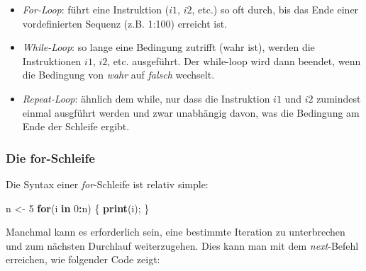 \documentclass[]{article}
\newenvironment{Shaded}{\begin{snugshade}}{\end{snugshade}}
\newcommand{\KeywordTok}[1]{\textcolor[rgb]{0.13,0.29,0.53}{\textbf{#1}}}
\newcommand{\DecValTok}[1]{\textcolor[rgb]{0.00,0.00,0.81}{#1}}
\newcommand{\StringTok}[1]{\textcolor[rgb]{0.31,0.60,0.02}{#1}}
\newcommand{\ControlFlowTok}[1]{\textcolor[rgb]{0.13,0.29,0.53}{\textbf{#1}}}
\newcommand{\OperatorTok}[1]{\textcolor[rgb]{0.81,0.36,0.00}{\textbf{#1}}}
\newcommand{\NormalTok}[1]{#1}
\providecommand{\tightlist}{%
  \setlength{\itemsep}{0pt}\setlength{\parskip}{0pt}}
\begin{document}
\begin{itemize}
\tightlist
\item
  \emph{For-Loop}: führt eine Instruktion (\(i1\), \(i2\), etc.) so oft
  durch, bis das Ende einer vordefinierten Sequenz (z.B. 1:100) erreicht
  ist.
\item
  \emph{While-Loop}: so lange eine Bedingung zutrifft (wahr ist), werden
  die Instruktionen \(i1\), \(i2\), etc. ausgeführt. Der while-loop wird
  dann beendet, wenn die Bedingung von \emph{wahr} auf \emph{falsch}
  wechselt.
\item
  \emph{Repeat-Loop}: ähnlich dem while, nur dass die Instruktion \(i1\)
  und \(i2\) zumindest einmal ausgführt werden und zwar unabhängig
  davon, was die Bedingung am Ende der Schleife ergibt.
\end{itemize}

\subsubsection*{Die for-Schleife}\label{die-for-schleife}

Die Syntax einer \emph{for}-Schleife ist relativ simple:

\begin{Shaded}
\begin{Highlighting}[]
\NormalTok{  n <-}\StringTok{ }\DecValTok{5}
  \ControlFlowTok{for}\NormalTok{(i }\ControlFlowTok{in} \DecValTok{0}\OperatorTok{:}\NormalTok{n) \{}
    \KeywordTok{print}\NormalTok{(i);}
\NormalTok{  \}}
\end{Highlighting}
\end{Shaded}

Manchmal kann es erforderlich sein, eine bestimmte Iteration zu
unterbrechen und zum nächsten Durchlauf weiterzugehen. Dies kann man mit
dem \emph{next}-Befehl erreichen, wie folgender Code zeigt:

\begin{Shaded}
\end{Shaded}
\end{document}
